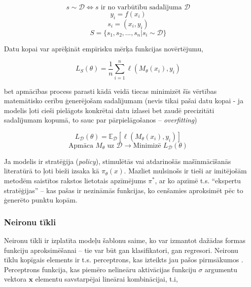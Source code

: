 \documentclass[12pt, a4paper]{article}
\numberwithin{equation}{section} %
\begin{document}
\begin{equation} 
    s \sim \mathcal{D} \Leftrightarrow s \text{ ir no varbūtību sadalījuma } \mathcal{D}
\end{equation}
\begin{equation} 
    y_i = f(x_i)
\end{equation}
\begin{equation} 
    s_i = (x_i, y_i)
\end{equation}
\begin{equation} 
    S = \lbrace s_1, s_2, ..., s_n \vert s_i \sim \mathcal{D}\rbrace
\end{equation}

Datu kopai var aprēķināt empīrisku mērķa funkcijas novērtējumu,

\begin{equation} 
    L_S(\theta) = \frac{1}{n}\sum_{i=1}^n\ell(M_{\theta}(x_i), y_i)
\end{equation}

bet apmācības process parasti kādā veidā tiecas minimizēt šīs vērtības matemātisko cerību ģenerējošam sadalījumam (nevis tikai pašai datu kopai - ja modelis ļoti cieši pielāgots konkrētai datu izlasei bet zaudē precizitāti sadalījumam kopumā, to sauc par pārpielāgošanos -- \textit{overfitting})

\begin{equation} 
    L_{\mathcal{D}}(\theta) = \mathbb{E}_{\mathcal{D}} [\ell(M_{\theta}(x_i), y_i)]
\end{equation}
\begin{equation} 
    \text{Apmāca } M_{\theta} \text{ uz } \mathcal{D} \rightarrow \text{Minimizē } L_{\mathcal{D}}(\theta)
\end{equation}

Ja modelis ir stratēģija (\textit{policy}), stimulētās vai atdarinošās mašīnmācīšanās literatūrā to ļoti bieži izsaka kā $\pi_{\theta}(x)$. Mazliet mulsinošs ir tieši ar imitējošām metodēm saistītos rakstos lietotais apzīmējums $\pi^*$, ar ko apzīmē t.s. ``ekspertu stratēģijas'' -- kas pašas ir nezināmās funkcijas, ko cenšamies aproksimēt pēc to ģenerēto punktu kopām. 

\subsubsection{Neironu tīkli}

Neironu tīkli ir izplatīta modeļu šablonu saime, ko var izmantot dažādas formas funkciju aproksimēšanai -- tie var būt gan klasifikatori, gan regresori. Neironu tīklu kopīgais elements ir t.s. perceptrons, kas izteikts jau pašos pirmsākumos \cite{mcculloch1943logical}. Perceptrons funkcija, kas piemēro nelineāru aktivācijas funkciju $\sigma$ argumentu vektora $ \boldsymbol{x}$ elementu savstarpējai lineārai kombinācijai, t.i,
\end{document}
